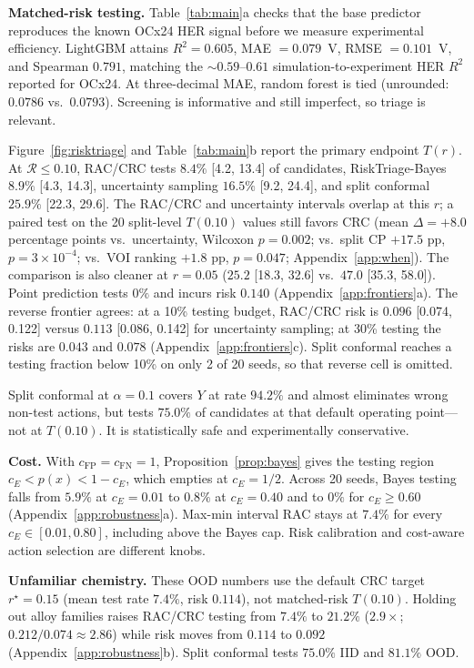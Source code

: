 \documentclass{article}
\newcommand{\risk}{\mathcal{R}}
\begin{document}
\textbf{Matched-risk testing.}
Table~\ref{tab:main}a checks that the base predictor reproduces the known OCx24 HER signal before we measure experimental efficiency.
LightGBM attains $R^2=0.605$, MAE $=0.079$~V, RMSE $=0.101$~V, and Spearman $0.791$, matching the ${\sim}0.59$--$0.61$ simulation-to-experiment HER $R^2$ reported for OCx24.
At three-decimal MAE, random forest is tied (unrounded: $0.0786$ vs.\ $0.0793$).
Screening is informative and still imperfect, so triage is relevant.

Figure~\ref{fig:risktriage} and Table~\ref{tab:main}b report the primary endpoint $T(r)$.
At $\risk\le 0.10$, RAC/CRC tests $8.4\%$ [4.2, 13.4] of candidates, RiskTriage-Bayes $8.9\%$ [4.3, 14.3], uncertainty sampling $16.5\%$ [9.2, 24.4], and split conformal $25.9\%$ [22.3, 29.6].
The RAC/CRC and uncertainty intervals overlap at this $r$; a paired test on the 20 split-level $T(0.10)$ values still favors CRC (mean $\Delta=+8.0$ percentage points vs.\ uncertainty, Wilcoxon $p=0.002$; vs.\ split CP $+17.5$ pp, $p=3{\times}10^{-4}$; vs.\ VOI ranking $+1.8$ pp, $p=0.047$; Appendix~\ref{app:when}).
The comparison is also cleaner at $r=0.05$ ($25.2$ [18.3, 32.6] vs.\ $47.0$ [35.3, 58.0]).
Point prediction tests $0\%$ and incurs risk $0.140$ (Appendix~\ref{app:frontiers}a).
The reverse frontier agrees: at a 10\% testing budget, RAC/CRC risk is $0.096$ [0.074, 0.122] versus $0.113$ [0.086, 0.142] for uncertainty sampling; at 30\% testing the risks are $0.043$ and $0.078$ (Appendix~\ref{app:frontiers}c).
Split conformal reaches a testing fraction below 10\% on only 2 of 20 seeds, so that reverse cell is omitted.

Split conformal at $\alpha=0.1$ covers $Y$ at rate $94.2\%$ and almost eliminates wrong non-test actions, but tests $75.0\%$ of candidates at that default operating point---not at $T(0.10)$.
It is statistically safe and experimentally conservative.

\textbf{Cost.}
With $c_{\mathrm{FP}}=c_{\mathrm{FN}}=1$, Proposition~\ref{prop:bayes} gives the testing region $c_E<p(x)<1-c_E$, which empties at $c_E=1/2$.
Across 20 seeds, Bayes testing falls from $5.9\%$ at $c_E=0.01$ to $0.8\%$ at $c_E=0.40$ and to $0\%$ for $c_E\ge 0.60$ (Appendix~\ref{app:robustness}a).
Max-min interval RAC stays at $7.4\%$ for every $c_E\in[0.01,0.80]$, including above the Bayes cap.
Risk calibration and cost-aware action selection are different knobs.

\textbf{Unfamiliar chemistry.}
These OOD numbers use the default CRC target $r^\star=0.15$ (mean test rate $7.4\%$, risk $0.114$), not matched-risk $T(0.10)$.
Holding out alloy families raises RAC/CRC testing from $7.4\%$ to $21.2\%$ ($2.9\times$; $0.212/0.074\approx 2.86$) while risk moves from $0.114$ to $0.092$ (Appendix~\ref{app:robustness}b).
Split conformal tests $75.0\%$ IID and $81.1\%$ OOD.
\end{document}

